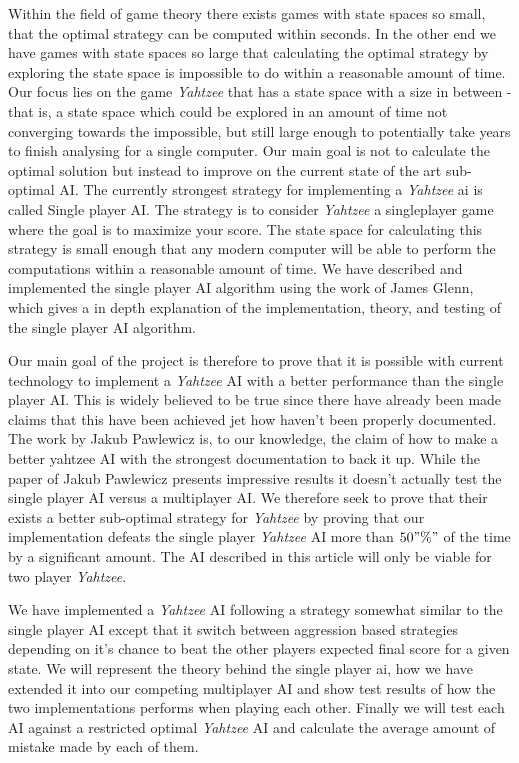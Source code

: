 Within the field of game theory there exists games with state spaces so small, that the optimal strategy can be computed within seconds. 
In the other end we have games with state spaces so large that calculating the optimal strategy by exploring the state space is impossible to do within a reasonable amount of time. 
Our focus lies on the game \emph{Yahtzee} that has a state space with a size in between - that is, a state space which could be explored in an amount of time not converging towards the impossible, but still large enough to potentially take years to finish analysing for a single computer. 
Our main goal is not to calculate the optimal solution but instead to improve on the current state of the art sub-optimal AI. 
The currently strongest strategy for implementing a \emph{Yahtzee} ai is called Single player AI. 
The strategy is to consider \emph{Yahtzee} a singleplayer game where the goal is to maximize your score. 
The state space for calculating this strategy is small enough that any modern computer will be able to perform the computations within a reasonable amount of time. 
We have described and implemented the single player AI algorithm using the work of James Glenn\cite{glenn2006optimal}, which gives a in depth explanation of the implementation, theory, and testing of the single player AI algorithm.

Our main goal of the project is therefore to prove that it is possible with current technology to implement a \emph{Yahtzee} AI with a better performance than the single player AI. 
This is widely believed to be true since there have already been made claims that this have been achieved jet how haven't been properly documented.
The work by Jakub Pawlewicz is, to our knowledge, the claim of how to make a better yahtzee AI with the strongest documentation to back it up. 
While the paper of Jakub Pawlewicz\citep{pawlewicz2011nearly} presents impressive results it doesn't actually test the single player AI versus a multiplayer AI.
We therefore seek to prove that their exists a better sub-optimal strategy for \emph{Yahtzee} by proving that our implementation defeats the single player \emph{Yahtzee} AI more than $50"\%" $ of the time by a significant amount. The AI described in this article will only be viable for two player \emph{Yahtzee}.

We have implemented a \emph{Yahtzee} AI following a strategy somewhat similar to the single player AI except that it switch between aggression based strategies depending on it's chance to beat the other players expected final score for a given state. 
We will represent the theory behind the single player ai, how we have extended it into our competing multiplayer AI and show test results of how the two implementations performs when playing each other. 
Finally we will test each AI against a restricted optimal \emph{Yahtzee} AI and calculate the average amount of mistake made by each of them.


